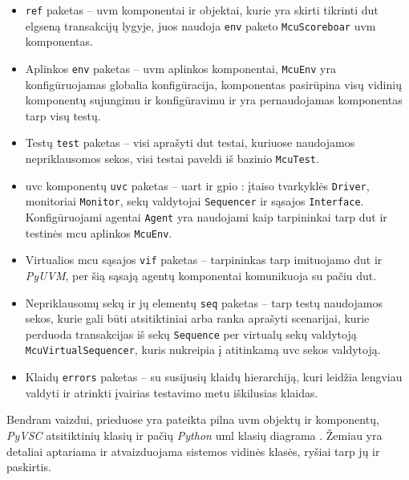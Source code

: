 \begin{itemize}
	\item {} \texttt{ref} paketas -- \gls{uvm} komponentai ir objektai, kurie yra skirti tikrinti \gls{dut} elgseną transakcijų lygyje, juos naudoja \texttt{env} paketo \texttt{McuScoreboar} \gls{uvm} komponentas. 
	\item Aplinkos \texttt{env} paketas -- \gls{uvm} aplinkos komponentai, \texttt{McuEnv} yra konfigūruojamas globalia konfigūracija, komponentas pasirūpina visų vidinių komponentų sujungimu ir konfigūravimu ir yra pernaudojamas komponentas tarp visų testų.
	\item Testų \texttt{test} paketas -- visi aprašyti \gls{dut} testai, kuriuose naudojamos nepriklausomos sekos, visi testai paveldi iš bazinio \texttt{McuTest}.
	\item \gls{uvc} komponentų \texttt{uvc} paketas -- \gls{uart} ir \gls{gpio} : įtaiso tvarkyklės \texttt{Driver}, monitoriai \texttt{Monitor}, sekų valdytojai \texttt{Sequencer} ir sąsajos \texttt{Interface}. Konfigūruojami agentai \texttt{Agent} yra naudojami kaip tarpininkai tarp \gls{dut}  ir testinės \gls{mcu} aplinkos \texttt{McuEnv}.
	\item Virtualios \gls{mcu} sąsajos \texttt{vif} paketas -- tarpininkas tarp imituojamo \gls{dut} ir \textit{PyUVM}, per šią sąsają agentų komponentai komunikuoja su pačiu \gls{dut}.
	\item Nepriklausomų sekų ir jų elementų \texttt{seq} paketas -- tarp testų naudojamos sekos, kurie gali būti atsitiktiniai arba ranka aprašyti scenarijai, kurie perduoda transakcijas iš sekų \texttt{Sequence} per virtualų sekų valdytoją \texttt{McuVirtualSequencer}, kuris nukreipia į atitinkamą  \gls{uvc} sekos valdytoją.
	\item Klaidų \texttt{errors} paketas -- su  susijusių klaidų hierarchiją, kuri leidžia lengviau valdyti ir atrinkti įvairias testavimo metu iškilusias klaidas.
\end{itemize}

Bendram vaizdui, prieduose yra pateikta pilna  \gls{uvm} objektų ir komponentų, \textit{PyVSC} atsitiktinių klasių ir pačių \textit{Python} \gls{uml} klasių diagrama \pav{\ref{fig:uml_class_tb_full}}. Žemiau yra detaliai aptariama ir atvaizduojama sistemos vidinės klasės, ryšiai tarp jų ir paskirtis.

